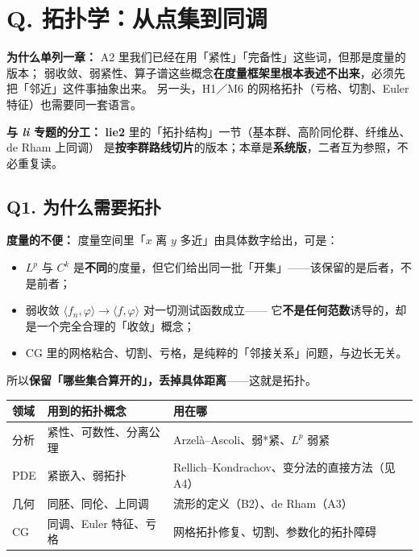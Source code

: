 \section{Q. 拓扑学：从点集到同调}
\label{sec:topology}

\textbf{为什么单列一章：} A2 里我们已经在用「紧性」「完备性」这些词，但那是度量的版本；
弱收敛、弱紧性、算子谱这些概念\textbf{在度量框架里根本表述不出来}，必须先把「邻近」这件事抽象出来。
另一头，H1／M6 的网格拓扑（亏格、切割、Euler 特征）也需要同一套语言。

\textbf{与 \emph{li} 专题的分工：} \textbf{lie2} 里的「拓扑结构」一节（基本群、高阶同伦群、纤维丛、de Rham 上同调）
是\textbf{按李群路线切片}的版本；本章是\textbf{系统版}，二者互为参照，不必重复读。

\subsection{Q1. 为什么需要拓扑}

\textbf{度量的不便：} 度量空间里「$x$ 离 $y$ 多近」由具体数字给出，可是：
\begin{itemize}
  \item $L^p$ 与 $C^k$ 是\textbf{不同}的度量，但它们给出同一批「开集」——该保留的是后者，不是前者；
  \item 弱收敛 $\langle f_n,\varphi\rangle\to\langle f,\varphi\rangle$ 对一切测试函数成立——
        它\textbf{不是任何范数}诱导的，却是一个完全合理的「收敛」概念；
  \item CG 里的网格粘合、切割、亏格，是纯粹的「邻接关系」问题，与边长无关。
\end{itemize}

所以\textbf{保留「哪些集合算开的」，丢掉具体距离}——这就是拓扑。

\begin{center}
\begin{tabular}{L{2.6cm}L{5.6cm}L{6.2cm}}
\toprule
\textbf{领域} & \textbf{用到的拓扑概念} & \textbf{用在哪} \\
\midrule
分析 & 紧性、可数性、分离公理 & Arzelà--Ascoli、弱*紧、$L^p$ 弱紧 \\
PDE & 紧嵌入、弱拓扑 & Rellich--Kondrachov、变分法的直接方法（见 A4） \\
几何 & 同胚、同伦、上同调 & 流形的定义（B2）、de Rham（A3） \\
CG & 同调、Euler 特征、亏格 & 网格拓扑修复、切割、参数化的拓扑障碍 \\
\bottomrule
\end{tabular}
\end{center}

